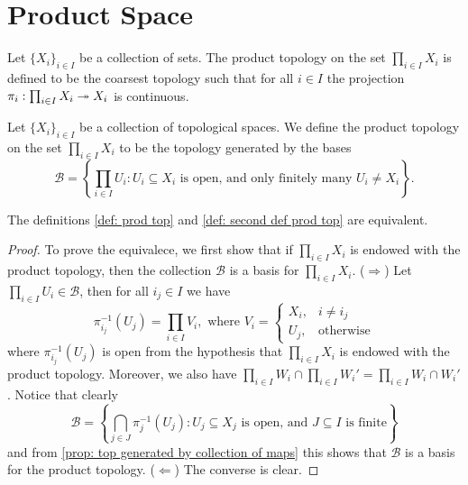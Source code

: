 \section{Product Space}

\begin{definition}
  \label{def: prod top}
  Let \(\{X_i\}_{i \in I}\) be a collection of sets. The product topology on the
  set \(\prod_{i \in I} X_i\) is defined to be the coarsest topology such that
  for all \(i \in I\) the projection \(\pi_i : \prod_{i \in I} X_i \twoheadrightarrow X_i\) is
  continuous.
\end{definition}

\begin{definition}
  \label{def: second def prod top}
  Let \(\{X_i\}_{i \in I}\) be a collection of topological spaces. We
  define the product topology on the set \(\prod_{i \in I} X_i\) to be the
  topology generated by the bases
  \[
    \mathcal B = \left\{ \prod_{i \in I} U_i \colon U_i \subseteq X_i
    \text{ is open, and only finitely many } U_i \neq X_i \right\}.
  \]
\end{definition}

\begin{corollary}\label{cor: equivalent defs prod top}
  The definitions \ref{def: prod top} and \ref{def: second def prod top}
  are equivalent.
\end{corollary}

\begin{proof}
  To prove the equivalece, we first show that if \(\prod_{i \in I} X_i\) is
  endowed with the product topology, then the collection \(\mathcal B\) is a
  basis for \(\prod_{i \in I} X_i\). (\(\Rightarrow\)) Let \(\prod_{i \in I} U_i
  \in \mathcal B\), then for all \(i_j \in I\) we have
  \[
    \pi_{i_j}^{-1}(U_j) = \prod_{i \in I} V_i, \text{ where } V_i =
    \begin{cases}
      X_i, &i \neq i_j \\
      U_j, &\text{otherwise}
    \end{cases}
  \]
  where \(\pi_{i_j}^{-1}(U_j)\) is open from the hypothesis that \(\prod_{i
  \in I} X_i\) is endowed with the product topology. Moreover, we also have
  \(\prod_{i \in I} W_i \cap \prod_{i \in I} W_i' = \prod_{i \in I} W_i \cap
  W_i'\). Notice that clearly
  \[
    \mathcal B = \left\{ \bigcap_{j \in J} \pi_j^{-1}(U_j) \colon U_j \subseteq X_j
    \text{ is open, and } J \subseteq I \text{ is finite}\right\}
  \]
  and from \cref{prop: top generated by collection of maps} this shows that
  \(\mathcal B\) is a basis for the product topology. (\(\Leftarrow\)) The
  converse is clear.
\end{proof}

